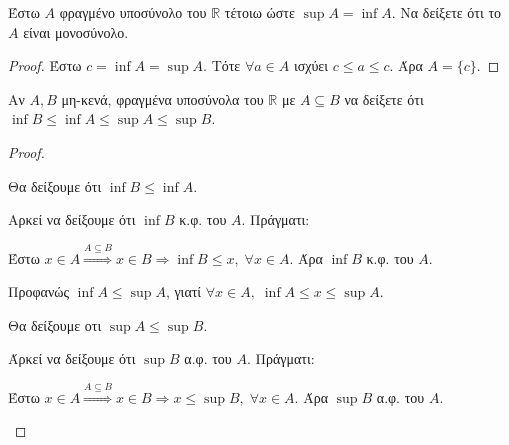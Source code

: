 \begin{multicols}{2}
\begin{enumerate}
    \item \textcolor{Col1}{Έστω $A$ φραγμένο υποσύνολο του $ \mathbb{R} $ τέτοιω ώστε 
      $ \sup A = \inf A $.  Να δείξετε ότι το $A$ είναι μονοσύνολο.}
      \begin{proof}
      \item {}
        Έστω $ c = \inf A = \sup A $. Τότε $ \forall a \in A $ ισχύει $ c \leq a \leq c
        $. Άρα $ A = \{ c \} $.
      \end{proof}

    \item \textcolor{Col1}{Αν $ A, B $ μη-κενά, φραγμένα υποσύνολα του 
        $ \mathbb{R} $ με $ A \subseteq B $ να δείξετε ότι 
      $ \inf B \leq \inf A \leq \sup A \leq \sup B $.}
      \begin{proof}
      \item {} 
        \begin{myitemize}
          \item Θα δείξουμε ότι $ \inf B \leq \inf A $. 

            Αρκεί να δείξουμε ότι $ \inf B $ κ.φ. του $A$. Πράγματι:

            Έστω $ x \in A \overset{A \subseteq B}{\Rightarrow} x \in B \Rightarrow 
            \inf B \leq x, \; \forall x \in A $. Άρα $ \inf B $ κ.φ. του $A$.
          \item Προφανώς $ \inf A \leq \sup A $, γιατί $ \forall x \in A, \; 
            \inf A \leq x \leq \sup A $.
          \item Θα δείξουμε οτι $ \sup A \leq \sup B $. 

            Άρκεί να δείξουμε ότι $ \sup B $ α.φ. του $A$. Πράγματι:

            Έστω $ x \in A \overset{A \subseteq B}{\Rightarrow} x \in B \Rightarrow 
            x \leq \sup B, \; \forall x \in A $.  Άρα $ \sup B $ α.φ. του $A$.
        \end{myitemize}
      \end{proof}


\end{enumerate}
\end{multicols}
